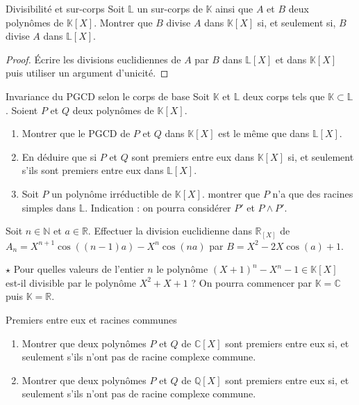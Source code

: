 \documentclass[french,a4paper]{article}
\newcommand{\N}{\mathbb{N}}
\newcommand{\Q}{\mathbb{Q}}
\newcommand{\R}{\mathbb{R}}
\newcommand{\C}{\mathbb{C}}
\newcommand{\K}{\mathbb{K}}
\renewcommand{\L}{\mathbb{L}}
\theoremstyle{plain}
\theoremstyle{definition}
\theoremstyle{remark}
\begin{document}
\begin{ex}[Moulin.AG.61]{Divisibilité et sur-corps}
	Soit $\L$ un sur-corps de $\K$ ainsi que $A$ et $B$ deux polynômes de $\K[X]$. Montrer que $B$ divise $A$ dans $\K[X]$ si, et seulement si, $B$ divise $A$ dans $\L[X]$.
\end{ex}
\begin{proof}
	Écrire les divisions euclidiennes de $A$ par $B$ dans $\L[X]$ et dans $\K[X]$ puis utiliser un argument d'unicité.
\end{proof}

\begin{ex}[Châteaux]{Invariance du PGCD selon le corps de base}
	Soit $\K$ et $\L$ deux corps tels que $\K\subset\L$. Soient $P$ et $Q$ deux polynômes de $\K[X]$.
	\begin{enumerate}
		\item Montrer que le PGCD de $P$ et $Q$ dans $\K[X]$ est le même que dans $\L[X]$.
		\item En déduire que si $P$ et $Q$ sont premiers entre eux dans $\K[X]$ si, et seulement s'ils sont premiers entre eux dans $\L[X]$.
		\item Soit $P$ un polynôme irréductible de $\K[X]$. montrer que $P$ n'a que des racines simples dans $\L$. Indication : on pourra considérer $P'$ et $P\wedge P'$.
	\end{enumerate}
\end{ex}

\begin{ex}[Moulin.AG.62]{}
	Soit $n\in\N$ et $a\in\R$. Effectuer la division euclidienne dans $\R_[X]$ de $A_n=X^{n+1}\cos((n-1)a)-X^n\cos(na)$ par $B=X^2-2X\cos(a)+1$.
\end{ex}

\begin{ex}[Moulin.AG.63]{$\star$}
	Pour quelles valeurs de l'entier $n$ le polynôme $(X+1)^n-X^n-1\in\K[X]$ est-il divisible par le polynôme $X^2+X+1$ ? On pourra commencer par $\K=\C$ puis $\K=\R$.
\end{ex}

\begin{ex}[Moulin.AG.64]{Premiers entre eux et racines communes}
	\begin{enumerate}
		\item Montrer que deux polynômes $P$ et $Q$ de $\C[X]$ sont premiers entre eux si, et seulement s'ils n'ont pas de racine complexe commune.
		\item Montrer que deux polynômes $P$ et $Q$ de $\Q[X]$ sont premiers entre eux si, et seulement s'ils n'ont pas de racine complexe commune.
	\end{enumerate}
\end{ex}
\end{document}
